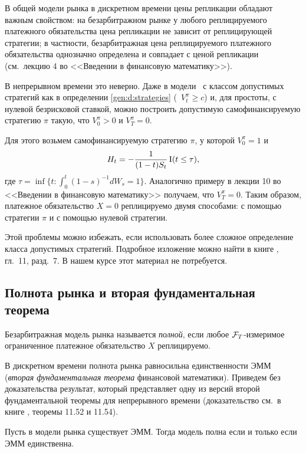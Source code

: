 \begin{remark}
\label{gen:r:replication}
В общей модели рынка в дискретном времени цены репликации обладают важным свойством: на безарбитражном рынке у любого реплицируемого платежного обязательства цена репликации не зависит от реплицирующей стратегии; в частности, безарбитражная цена реплицируемого платежного обязательства однозначно определена и совпадает с ценой репликации (см.~лекцию 4 во <<Введении в финансовую математику>>).

В непрерывном времени это неверно.
Даже в модели \bs\ с классом допустимых стратегий как в определении \ref{gen:d:strategies} (\te\ $V_t^\pi\ge c$) и, для простоты, с нулевой безрисковой ставкой, можно построить допустимую самофинансируемую стратегию $\pi$ такую, что $V_0^\pi > 0$ и $V_T^\pi = 0$.

Для этого возьмем самофинансируемую стратегию $\pi$, у которой $V_0^\pi = 1$ и
\[
H_t = -\frac{1}{(1-t)S_t} \operatorname{I}(t\le\tau),
\]
где $\tau = \inf\{t: \int_0^t (1-s)^{-1} d W_s = 1\}$. 
Аналогично примеру в лекции 10 во <<Введении в финансовую математику>> получаем, что $V_T^\pi=0$.
Таким образом, платежное обязательство $X=0$ реплицируемо двумя способами: с помощью стратегии $\pi$ и с помощью нулевой стратегии.

Этой проблемы можно избежать, если использовать более сложное определение класса допустимых стратегий.
Подробное изложение можно найти в книге \cite{EberleinKallsen19}, гл.~11, разд.~7.
В нашем курсе этот материал не потребуется.
\end{remark}


\subsection{Полнота рынка и вторая фундаментальная теорема}
\label{gen:s:complete}

\begin{definition}
Безарбитражная модель рынка называется \emph{полной}, если любое $\mathcal{F}_T$-измеримое ограниченное платежное обязательство $X$ реплицируемо.
\end{definition}

В дискретном времени полнота рынка равносильна единственности ЭММ (\emph{вторая фундаментальная теорема} финансовой математики).
Приведем без доказательства результат, который представляет одну из версий второй фундаментальной теоремы для непрерывного времени (доказательство см.~в книге \cite{EberleinKallsen19}, теоремы 11.52 и 11.54).

\begin{theorem}
Пусть в модели рынка существует ЭММ.
Тогда модель полна если и только если ЭММ единственна.
\end{theorem}

